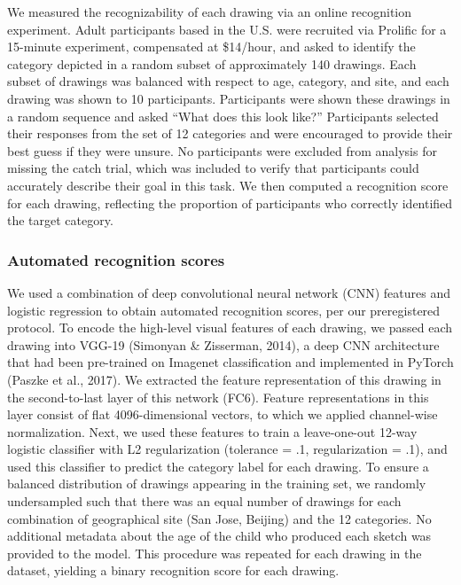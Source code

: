 \documentclass[
  english,
  man]{apa6}
\begin{document}
We measured the recognizability of each drawing via an online recognition experiment.
Adult participants based in the U.S. were recruited via Prolific for a 15-minute experiment, compensated at \$14/hour, and asked to identify the category depicted in a random subset of approximately 140 drawings.
Each subset of drawings was balanced with respect to age, category, and site, and each drawing was shown to 10 participants.
Participants were shown these drawings in a random sequence and asked \enquote{What does this look like?}
Participants selected their responses from the set of 12 categories and were encouraged to provide their best guess if they were unsure.
No participants were excluded from analysis for missing the catch trial, which was included to verify that participants could accurately describe their goal in this task.
We then computed a recognition score for each drawing, reflecting the proportion of participants who correctly identified the target category.

\hypertarget{automated-recognition-scores}{%
\subsubsection{Automated recognition scores}\label{automated-recognition-scores}}

We used a combination of deep convolutional neural network (CNN) features and logistic regression to obtain automated recognition scores, per our preregistered protocol.
To encode the high-level visual features of each drawing, we passed each drawing into VGG-19 (Simonyan \& Zisserman, 2014), a deep CNN architecture that had been pre-trained on Imagenet classification and implemented in PyTorch (Paszke et al., 2017).
We extracted the feature representation of this drawing in the second-to-last layer of this network (FC6).
Feature representations in this layer consist of flat 4096-dimensional vectors, to which we applied channel-wise normalization.
Next, we used these features to train a leave-one-out 12-way logistic classifier with L2 regularization (tolerance = .1, regularization = .1), and used this classifier to predict the category label for each drawing.
To ensure a balanced distribution of drawings appearing in the training set, we randomly undersampled such that there was an equal number of drawings for each combination of geographical site (San Jose, Beijing) and the 12 categories.
No additional metadata about the age of the child who produced each sketch was provided to the model.
This procedure was repeated for each drawing in the dataset, yielding a binary recognition score for each drawing.
\end{document}
